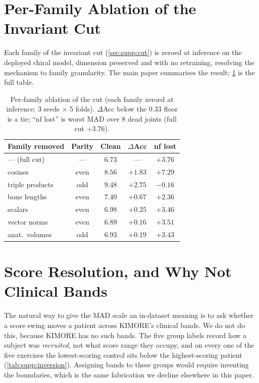 \documentclass[10pt,twocolumn,letterpaper]{article}
\begin{document}
\section{Per-Family Ablation of the Invariant Cut}\label{sec:supp:ablation}
Each family of the invariant cut (\cref{sec:supp:cut}) is zeroed at inference on the deployed chiral
model, dimension preserved and with no retraining, resolving the mechanism to family granularity. The
main paper summarises the result; \cref{tab:supp:ablation} is the full table.

\begin{table}[h]
\centering\small
\setlength{\tabcolsep}{4pt}
\begin{tabular}{lcccc}
\toprule
Family removed & Parity & Clean & $\Delta$Acc & nf lost \\
\midrule
--- (full cut)  & ---  & $6.73$ & ---   & $+3.76$ \\
cosines         & even & $8.56$ & $\mathbf{+1.83}$ & $\mathbf{+7.29}$ \\
triple products & odd  & $9.48$ & $\mathbf{+2.75}$ & $-0.16$ \\
bone lengths    & even & $7.40$ & $+0.67$ & $+2.36$ \\
scalars         & even & $6.98$ & $+0.25$ & $+3.46$ \\
vector norms    & even & $6.89$ & $+0.16$ & $+3.51$ \\
anat.\ volumes  & odd  & $6.93$ & $+0.19$ & $+3.43$ \\
\bottomrule
\end{tabular}
\caption{Per-family ablation of the cut (each family zeroed at inference; 3 seeds $\times$ 5 folds).
$\Delta$Acc below the $0.33$ floor is a tie; ``nf lost'' is worst MAD over $8$ dead joints
(full cut $+3.76$).}
\label{tab:supp:ablation}
\end{table}

\section{Score Resolution, and Why Not Clinical Bands}\label{sec:supp:resolution}
The natural way to give the MAD scale an in-dataset meaning is to ask whether a score swing moves a
patient across KIMORE's clinical bands. We do not do this, because KIMORE has no such bands. The five
group labels record how a subject was \emph{recruited}, not what score range they occupy, and on every
one of the five exercises the lowest-scoring control sits below the highest-scoring patient
(\cref{tab:supp:inversion}). Assigning bands to these groups would require inventing the boundaries,
which is the same fabrication we decline elsewhere in this paper.
\end{document}
